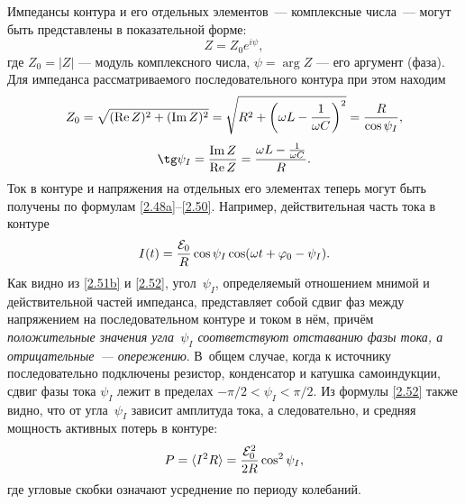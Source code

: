 Импедансы контура и его отдельных элементов~--- комплексные числа~--- могут быть
представлены в показательной форме:
\begin{equation}
Z = Z_0 e^{i\psi},
\end{equation}
где $Z_0 = |Z|$ --- модуль комплексного числа, 
$\psi = \arg Z$ --- его аргумент (фаза).
Для импеданса рассматриваемого
последовательного контура при этом находим
		\begin{equation}
			\eqmark{2.51a}
    Z_0=\sqrt{(\Re Z)^2 + (\Im Z)^2}=\sqrt{R^2+\left(\omega L-\frac{1}{\omega C}\right)^2}=\frac{R}{\cos\psi_I},
		\end{equation}
		\begin{equation}
			\eqmark{2.51b}
	\tg\psi_I=\frac{\Im Z}{\Re Z}=\frac{\omega L-\frac{1}{\omega C}}{R}.
		\end{equation}
Ток в контуре и напряжения на отдельных его элементах теперь
могут быть получены по формулам \eqref{2.48a}--\eqref{2.50}. Например,
действительная часть тока в контуре
\begin{equation}
	\eqmark{2.52}
	I(t)=\frac{\mathcal{E}_0}{R}\cos\psi_I\cos(\omega t+\varphi_0-\psi_I).
\end{equation}
Как видно из \eqref{2.51b} и \eqref{2.52}, угол~$\psi_I$, определяемый отношением мнимой и
действительной частей импеданса, представляет собой сдвиг фаз между напряжением
на последовательном контуре и током в нём, причём \emph{положительные
значения угла~$\psi_I$ соответствуют отставанию фазы тока, а
отрицательные~--- опережению}. В~общем случае, когда к источнику последовательно
подключены резистор, конденсатор и катушка самоиндукции, сдвиг фазы тока
$\psi_I$ лежит в пределах $-\pi/2<\psi_I<\pi/2$. Из формулы \eqref{2.52} также
видно, что от угла~$\psi_I$ зависит амплитуда тока, а следовательно, и средняя
мощность активных потерь в контуре:
\begin{equation}\eqmark{2.53}
	P=\langle I^2R\rangle=\frac{\mathcal{E}_0^2}{2R}\cos^2\psi_I,
\end{equation}
где угловые скобки означают усреднение по периоду колебаний.


\label{sec:vectordia}

